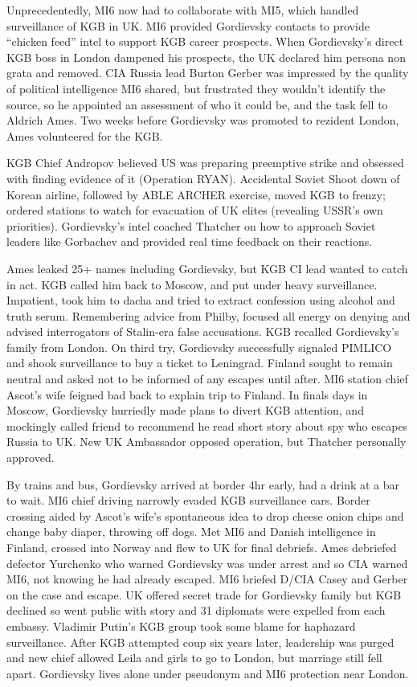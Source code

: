 \documentclass[
]{article}
\begin{document}
Unprecedentedly, MI6 now had to collaborate with MI5, which handled
surveillance of KGB in UK. MI6 provided Gordievsky contacts to provide
``chicken feed'' intel to support KGB career prospects. When
Gordievsky's direct KGB boss in London dampened his prospects, the UK
declared him persona non grata and removed. CIA Russia lead Burton
Gerber was impressed by the quality of political intelligence MI6
shared, but frustrated they wouldn't identify the source, so he
appointed an assessment of who it could be, and the task fell to Aldrich
Ames. Two weeks before Gordievsky was promoted to rezident London, Ames
volunteered for the KGB.

KGB Chief Andropov believed US was preparing preemptive strike and
obsessed with finding evidence of it (Operation RYAN). Accidental Soviet
Shoot down of Korean airline, followed by ABLE ARCHER exercise, moved
KGB to frenzy; ordered stations to watch for evacuation of UK elites
(revealing USSR's own priorities). Gordievsky's intel coached Thatcher
on how to approach Soviet leaders like Gorbachev and provided real time
feedback on their reactions.

Ames leaked 25+ names including Gordievsky, but KGB CI lead wanted to
catch in act. KGB called him back to Moscow, and put under heavy
surveillance. Impatient, took him to dacha and tried to extract
confession using alcohol and truth serum. Remembering advice from
Philby, focused all energy on denying and advised interrogators of
Stalin-era false accusations. KGB recalled Gordievsky's family from
London. On third try, Gordievsky successfully signaled PIMLICO and shook
surveillance to buy a ticket to Leningrad. Finland sought to remain
neutral and asked not to be informed of any escapes until after. MI6
station chief Ascot's wife feigned bad back to explain trip to Finland.
In finals days in Moscow, Gordievsky hurriedly made plans to divert KGB
attention, and mockingly called friend to recommend he read short story
about spy who escapes Russia to UK. New UK Ambassador opposed operation,
but Thatcher personally approved.

By trains and bus, Gordievsky arrived at border 4hr early, had a drink
at a bar to wait. MI6 chief driving narrowly evaded KGB surveillance
cars. Border crossing aided by Ascot's wife's spontaneous idea to drop
cheese onion chips and change baby diaper, throwing off dogs. Met MI6
and Danish intelligence in Finland, crossed into Norway and flew to UK
for final debriefs. Ames debriefed defector Yurchenko who warned
Gordievsky was under arrest and so CIA warned MI6, not knowing he had
already escaped. MI6 briefed D/CIA Casey and Gerber on the case and
escape. UK offered secret trade for Gordievsky family but KGB declined
so went public with story and 31 diplomats were expelled from each
embassy. Vladimir Putin's KGB group took some blame for haphazard
surveillance. After KGB attempted coup six years later, leadership was
purged and new chief allowed Leila and girls to go to London, but
marriage still fell apart. Gordievsky lives alone under pseudonym and
MI6 protection near London.
\end{document}
